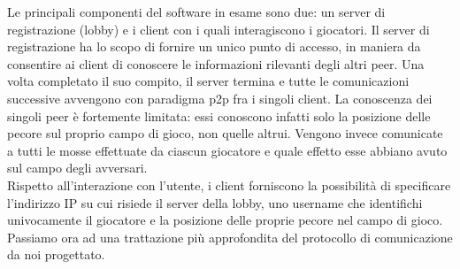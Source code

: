 Le principali componenti del software in esame sono due: un server di 
registrazione (lobby) e i client con i quali interagiscono i giocatori.
Il server di registrazione ha lo scopo di fornire un unico punto di accesso, 
in maniera da consentire ai client di conoscere le informazioni rilevanti degli 
altri peer. Una volta completato il suo compito, il server termina e tutte le 
comunicazioni successive avvengono con paradigma p2p fra i singoli client.
La conoscenza dei singoli peer è fortemente limitata: essi conoscono infatti 
solo la posizione delle pecore sul proprio campo di gioco, non quelle altrui. 
Vengono invece comunicate a tutti le mosse effettuate da ciascun giocatore e 
quale effetto esse abbiano avuto sul campo degli avversari.
\\
Rispetto all'interazione con l'utente, i client forniscono la possibilità di 
specificare l'indirizzo IP su cui risiede il server della lobby, uno username 
che identifichi univocamente il giocatore e la posizione delle proprie pecore 
nel campo di gioco.
\\
Passiamo ora ad una trattazione più approfondita del protocollo di 
comunicazione da noi progettato.



